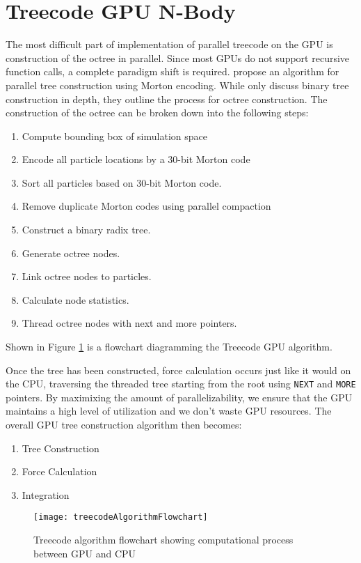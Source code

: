 \documentclass{thesis}
\begin{document}
\section{Treecode GPU N-Body}
The most difficult part of implementation of parallel treecode on the GPU is construction of the octree in parallel. Since most GPUs do not support recursive function calls, a complete paradigm shift is required. \cite{Karras:2012} propose an algorithm for parallel tree construction using Morton encoding. While \cite{Karras:2012} only discuss binary tree construction in depth, they outline the process for octree construction. The construction of the octree can be broken down into the following steps:
\begin{enumerate}[noitemsep]
    \item Compute bounding box of simulation space
    \item Encode all particle locations by a 30-bit Morton code
    \item Sort all particles based on 30-bit Morton code.
    \item Remove duplicate Morton codes using parallel compaction
    \item Construct a binary radix tree.
    \item Generate octree nodes.
    \item Link octree nodes to particles.
    \item Calculate node statistics.
    \item Thread octree nodes with next and more pointers.
\end{enumerate}
Shown in Figure \ref{fig:GPUTreecodeAlg} is a flowchart diagramming the Treecode GPU algorithm.

Once the tree has been constructed, force calculation occurs just like it would on the CPU, traversing the threaded tree starting from the root using \texttt{NEXT} and \texttt{MORE} pointers. By maximixing the amount of parallelizability, we ensure that the GPU maintains a high level of utilization and we don't waste GPU resources. The overall GPU tree construction algorithm then becomes:
\begin{enumerate}[noitemsep]
    \item Tree Construction
    \item Force Calculation
    \item Integration
\end{enumerate}
\begin{figure}[h]
    \caption{Treecode algorithm flowchart showing computational process between GPU and CPU}
    \label{fig:GPUTreecodeAlg}
    \centering
    \texttt{[image: treecodeAlgorithmFlowchart]}
\end{figure}
\end{document}
